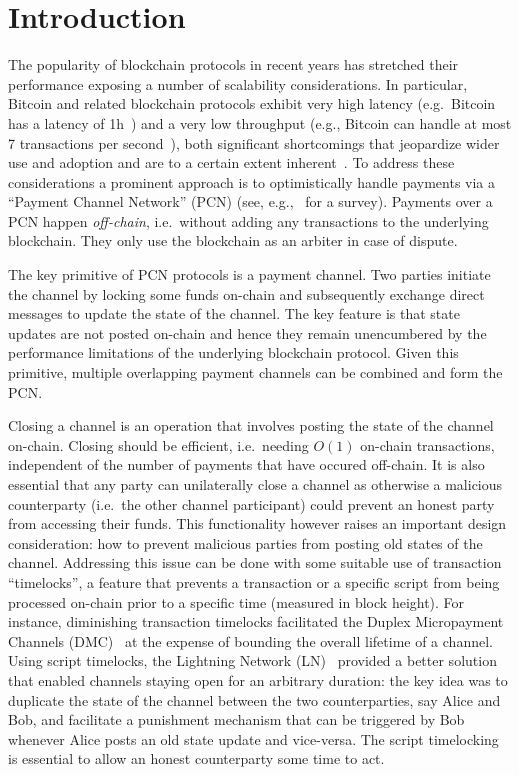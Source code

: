 \section{Introduction}
  The popularity of blockchain protocols in recent years has stretched their
  performance exposing a number of scalability considerations. In particular,
  Bitcoin and related blockchain protocols exhibit very high latency (e.g.\
  Bitcoin has a latency of 1h~\cite{bitcoin}) and a very low throughput (e.g.,
  Bitcoin can handle at most 7 transactions per second~\cite{scaling}), both
  significant shortcomings that jeopardize wider use and adoption and are to a
  certain extent inherent~\cite{scaling}. To address these considerations a
  prominent approach is to optimistically handle payments via a ``Payment
  Channel Network'' (PCN) (see, e.g.,~\cite{DBLP:conf/fc/GudgeonMRMG20} for a
  survey). Payments over a PCN happen \emph{off-chain}, i.e.\ without adding any
  transactions to the underlying blockchain. They only use the blockchain as an
  arbiter in case of dispute.

The key primitive of PCN protocols is a payment channel. Two parties initiate
the channel by locking some funds on-chain and subsequently exchange direct
messages to update the state of the channel. The key feature is that state
updates are not posted on-chain and hence they remain unencumbered by the
performance limitations of the underlying blockchain protocol. Given this
primitive, multiple overlapping payment channels can be combined and form the
PCN.

Closing a channel is an operation that involves posting the state of the channel
on-chain. Closing should be efficient, i.e.\ needing $O(1)$ on-chain
transactions, independent of the number of payments that have occured off-chain.
It is also essential that any party can unilaterally close a channel as
otherwise a malicious counterparty (i.e.\ the other channel participant) could
prevent an honest party from accessing their funds. This functionality however
raises an important design consideration: how to prevent malicious parties from
posting old states of the channel.
%
Addressing this issue can be done with some suitable use of transaction
``timelocks'', a feature that prevents a transaction or a specific script from
being processed on-chain prior to a specific time (measured in block height).
%
For instance, diminishing transaction timelocks facilitated the Duplex
Micropayment Channels (DMC)~\cite{decker} at the expense of bounding the overall
lifetime of a channel. Using script timelocks, the Lightning Network
(LN)~\cite{lightning} provided a better solution that enabled channels staying
open for an arbitrary duration: the key idea was to duplicate the state of the
channel between the two counterparties, say Alice and Bob, and facilitate a
punishment mechanism that can be triggered by Bob whenever Alice posts an old
state update and vice-versa. The script timelocking is essential to allow an
honest counterparty some time to act.

